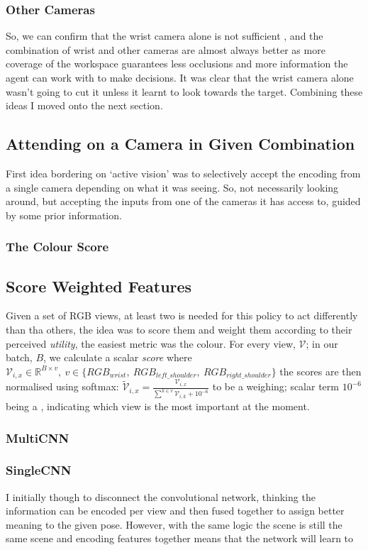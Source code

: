 \subsubsection{Other Cameras}
So, we can confirm that the wrist camera alone is not sufficient , and the combination of wrist and other cameras are almost always better as more coverage of the workspace guarantees less occlusions and more information the agent can work with to make decisions. It was clear that the wrist camera alone wasn't going to cut it unless it learnt to look towards the target. Combining these ideas I moved onto the next section.

\subsection{Attending on a Camera in Given Combination}
First idea bordering on `active vision' was to selectively accept the encoding from a single camera depending on what it was seeing. So, not necessarily looking around, but accepting the inputs from one of the cameras it has access to, guided by some prior information.

\subsubsection{The Colour Score}

\subsection{Score Weighted Features}
Given a set of RGB views, at least two is needed for this policy to act differently than tha others, the idea was to score them and weight them according to their perceived \emph{utility}, the easiest metric was the colour. For every view, $\mathcal{V}$; in our batch, $B$, we calculate a scalar \emph{score} where \(\mathcal{V}_{i, x} \in \mathbb{R}^{B \times {v}}, ~{v} \in \{ {RGB}_{wrist}, ~{RGB}_{left\_shoulder}, ~{RGB}_{right\_shoulder} \}\) the scores are then normalised using softmax: \( \tilde{\mathcal{V}}_{i, x} = \frac{\mathcal{V}_{i, x}}{\sum_{}^{k \in v} \mathcal{V}_{i, k} + 10^{-6}} \) to be a weighing; scalar term $10^{-6}$ being a , indicating which view is the most important at the moment. 




\subsubsection{MultiCNN}
\subsubsection{SingleCNN}
I initially though to disconnect the convolutional network, thinking the information can be encoded per view and then fused together to assign better meaning to the given pose. However, with the same logic the scene is still the same scene and encoding features together means that the network will learn to 